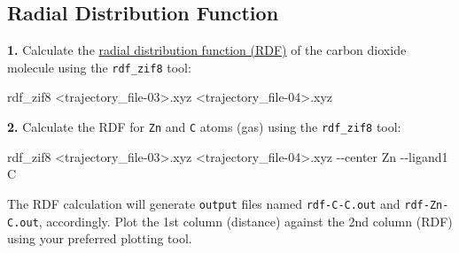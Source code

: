 \documentclass[
  letterpaper,
]{article}
\newenvironment{Shaded}{\begin{snugshade}}{\end{snugshade}}
\newcommand{\AttributeTok}[1]{\textcolor[rgb]{0.40,0.45,0.13}{#1}}
\newcommand{\ExtensionTok}[1]{\textcolor[rgb]{0.00,0.23,0.31}{#1}}
\newcommand{\NormalTok}[1]{\textcolor[rgb]{0.00,0.23,0.31}{#1}}
\newcommand{\OperatorTok}[1]{\textcolor[rgb]{0.37,0.37,0.37}{#1}}
\begin{document}
\hypertarget{radial-distribution-function}{%
\subsection*{Radial Distribution
Function}\label{radial-distribution-function}}


\textbf{1.} Calculate the
\protect\hyperlink{radial-distribution-functions-ux28rdfsux29}{radial
distribution function (RDF)} of the carbon dioxide molecule using the
\texttt{rdf\_zif8} tool:

\begin{Shaded}
\begin{Highlighting}[]
\ExtensionTok{rdf\_zif8} \OperatorTok{\textless{}}\NormalTok{trajectory\_file{-}03}\OperatorTok{\textgreater{}}\NormalTok{.xyz }\OperatorTok{\textless{}}\NormalTok{trajectory\_file{-}04}\OperatorTok{\textgreater{}}\NormalTok{.xyz}
\end{Highlighting}
\end{Shaded}

\textbf{2.} Calculate the RDF for \texttt{Zn} and \texttt{C} atoms (gas)
using the \texttt{rdf\_zif8} tool:

\begin{Shaded}
\begin{Highlighting}[]
\ExtensionTok{rdf\_zif8} \OperatorTok{\textless{}}\NormalTok{trajectory\_file{-}03}\OperatorTok{\textgreater{}}\NormalTok{.xyz }\OperatorTok{\textless{}}\NormalTok{trajectory\_file{-}04}\OperatorTok{\textgreater{}}\NormalTok{.xyz }\AttributeTok{{-}{-}center}\NormalTok{ Zn }\AttributeTok{{-}{-}ligand1}\NormalTok{ C}
\end{Highlighting}
\end{Shaded}

\begin{tcolorbox}[enhanced jigsaw, toptitle=1mm, opacitybacktitle=0.6, colframe=quarto-callout-note-color-frame, toprule=.15mm, breakable, bottomrule=.15mm, left=2mm, title=\textcolor{quarto-callout-note-color}{\faInfo}\hspace{0.5em}{Note}, titlerule=0mm, leftrule=.75mm, bottomtitle=1mm, coltitle=black, arc=.35mm, rightrule=.15mm, opacityback=0, colback=white, colbacktitle=quarto-callout-note-color!10!white]

The RDF calculation will generate \texttt{output} files named
\texttt{rdf-C-C.out} and \texttt{rdf-Zn-C.out}, accordingly. Plot the
1st column (distance) against the 2nd column (RDF) using your preferred
plotting tool.

\end{tcolorbox}
\end{document}
